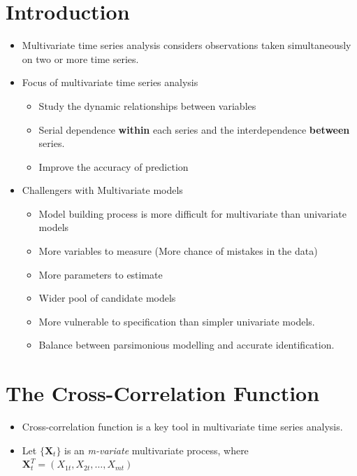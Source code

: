 \documentclass[]{book}
\providecommand{\tightlist}{%
  \setlength{\itemsep}{0pt}\setlength{\parskip}{0pt}}
\begin{document}
\hypertarget{introduction-2}{%
\section{Introduction}\label{introduction-2}}

\begin{itemize}
\tightlist
\item
  Multivariate time series analysis considers observations taken simultaneously on two or more time series.
\item
  Focus of multivariate time series analysis

  \begin{itemize}
  \tightlist
  \item
    Study the dynamic relationships between variables
  \item
    Serial dependence \textbf{within} each series and the interdependence \textbf{between} series.
  \item
    Improve the accuracy of prediction
  \end{itemize}
\item
  Challengers with Multivariate models

  \begin{itemize}
  \tightlist
  \item
    Model building process is more difficult for multivariate than univariate models
  \item
    More variables to measure (More chance of mistakes in the data)
  \item
    More parameters to estimate
  \item
    Wider pool of candidate models
  \item
    More vulnerable to specification than simpler univariate models.
  \item
    Balance between parsimonious modelling and accurate identification.
  \end{itemize}
\end{itemize}

\newpage

\hypertarget{the-cross-correlation-function}{%
\section{The Cross-Correlation Function}\label{the-cross-correlation-function}}

\begin{itemize}
\tightlist
\item
  Cross-correlation function is a key tool in multivariate time series analysis.
\item
  Let \(\{\mathbf{X}_t\}\) is an \emph{m-variate} multivariate process, where \(\mathbf{X}_t^T = (X_{1t}, X_{2t}, \dots, X_{mt})\)
\end{itemize}
\end{document}
